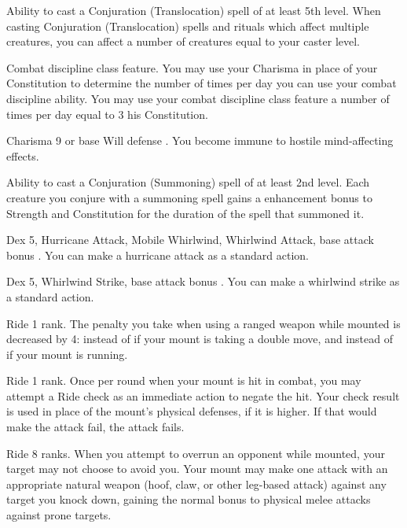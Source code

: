\featpre Ability to cast a Conjuration (Translocation) spell of at least 5th level.
\featben When casting Conjuration (Translocation) spells and rituals which affect multiple creatures, you can affect a number of creatures equal to your caster level.

\featpre Combat discipline class feature.
\featben You may use your Charisma in place of your Constitution to determine the number of times per day you can use your combat discipline ability.
 You may use your combat discipline class feature a number of times per day equal to 3 \add his Constitution.

\featpre Charisma 9 or base Will defense .
\featben You become immune to hostile mind-affecting effects.

 Ability to cast a Conjuration (Summoning) spell of at least 2nd level.
 Each creature you conjure with a summoning spell gains a  enhancement bonus to Strength and Constitution for the duration of the spell that summoned it.

\featpres Dex 5, Hurricane Attack, Mobile Whirlwind, Whirlwind Attack, base attack bonus .
\featben You can make a hurricane attack as a standard action.

\featpres Dex 5, Whirlwind Strike, base attack bonus .
\featben You can make a whirlwind strike as a standard action.

\featpre Ride 1 rank.
 The penalty you take when using a ranged weapon while mounted is decreased by 4:  instead of  if your mount is taking a double move, and  instead of  if your mount is running.

 Ride 1 rank.
 Once per round when your mount is hit in combat, you may attempt a Ride check as an immediate action to negate the hit. Your check result is used in place of the mount's physical defenses, if it is higher. If that would make the attack fail, the attack fails.

 Ride 8 ranks.
 When you attempt to overrun an opponent while mounted, your target may not choose to avoid you. Your mount may make one attack with an appropriate natural weapon (hoof, claw, or other leg-based attack) against any target you knock down, gaining the normal  bonus to physical melee attacks against prone targets.

